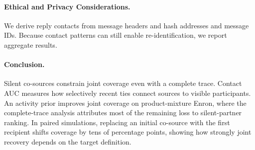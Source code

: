 \paragraph{Ethical and Privacy Considerations.}
We derive reply contacts from message headers and hash addresses and message IDs. Because contact patterns can still enable re-identification, we report aggregate results.

\paragraph{Conclusion.}
Silent co-sources constrain joint coverage even with a complete trace. Contact AUC measures how selectively recent ties connect sources to visible participants. An activity prior improves joint coverage on product-mixture Enron, where the complete-trace analysis attributes most of the remaining loss to silent-partner ranking. In paired simulations, replacing an initial co-source with the first recipient shifts coverage by tens of percentage points, showing how strongly joint recovery depends on the target definition.
